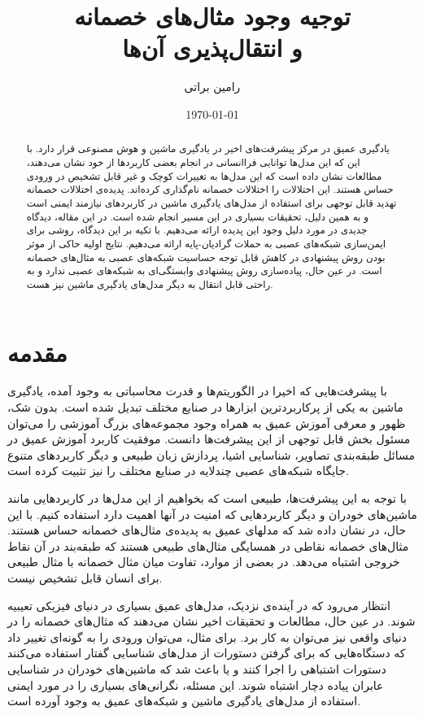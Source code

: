 \documentclass[12pt,onecolumn,a4paper]{article}
\begin{document}
\title{توجیه وجود مثال‌های خصمانه \\ و انتقال‌پذیری آن‌ها} 
\author{رامین براتی}
\date{\today}
\maketitle

\begin{abstract}
یادگیری عمیق در مرکز پیشرفت‌های اخیر در یادگیری ماشین و هوش مصنوعی قرار دارد. با این که این مدل‌ها توانایی فراانسانی در انجام بعضی کاربردها از خود نشان می‌دهند، مطالعات نشان داده است که این مدل‌ها به تغییرات کوچک و غیر قابل تشخیص در ورودی حساس هستند. این اختلالات را اختلالات خصمانه نام‌گذاری کرده‌اند. پدیده‌ی اختلالات خصمانه تهدید قابل توجهی برای استفاده از مدل‌های یادگیری ماشین در کاربردهای نیازمند ایمنی است و به همین دلیل، تحقیقات بسیاری در این مسیر انجام شده است. در این مقاله، دیدگاه جدیدی در مورد دلیل وجود این پدیده ارائه می‌دهیم. با تکیه بر این دیدگاه، روشی برای ایمن‌سازی شبکه‌های عصبی به حملات گرادیان-پایه ارائه می‌دهیم. نتایج اولیه حاکی از موثر بودن روش پیشنهادی در کاهش قابل توجه حساسیت شبکه‌های عصبی به مثال‌های خصمانه است. در عین حال، پیاده‌سازی روش پیشنهادی وابستگی‌ای به شبکه‌های عصبی ندارد و به راحتی قابل انتقال به دیگر مدل‌های یادگیری ماشین نیز هست.
\end{abstract}

\section{مقدمه} 
با پیشرفت‌هایی که اخیرا در الگوریتم‌ها و قدرت محاسباتی به وجود آمده، یادگیری ماشین به یکی از پرکاربردترین ابزارها در صنایع مختلف تبدیل شده است. بدون شک، ظهور و معرفی آموزش عمیق به همراه وجود مجموعه‌های بزرگ آموزشی را می‌توان مسئول بخش قابل توجهی از این پیشرفت‌ها دانست. موفقیت‌ کاربرد آموزش عمیق در مسائل طبقه‌بندی تصاویر، شناسایی اشیا، پردازش زبان طبیعی و دیگر کاربردهای متنوع جایگاه شبکه‌های عصبی چندلایه در صنایع مختلف را نیز تثبیت کرده است.

با توجه به این پیشرفت‌ها، طبیعی است که بخواهیم از این مدل‌ها در کاربردهایی مانند ماشین‌های خودران و دیگر کاربردهایی که امنیت در آنها اهمیت دارد استفاده کنیم. با این حال، در
\cite{szegedy2013intriguing} 
نشان داده شد که مدلهای عمیق به پدیده‌ی مثال‌های خصمانه حساس هستند. مثال‌های خصمانه نقاطی در همسایگی مثال‌های طبیعی هستند که طبقه‌بند در آن نقاط خروجی اشتباه می‌دهد. در بعضی از موارد، تفاوت میان مثال خصمانه با مثال طبیعی برای انسان قابل تشخیص نیست.

انتظار می‌رود که در آینده‌ی نزدیک، مدل‌های عمیق بسیاری در دنیای فیزیکی تعیبیه شوند. در عین حال، مطالعات و تحقیقات اخیر نشان می‌دهند که مثال‌های خصمانه را در دنیای واقعی نیز می‌توان به کار برد. برای مثال، می‌توان ورودی را به گونه‌ای تغییر داد که دستگاه‌هایی که برای گرفتن دستورات از مدل‌های شناسایی گفتار استفاده می‌کنند دستورات اشتباهی را اجرا کنند و یا باعث شد که ماشین‌های خودران در شناسایی عابران پیاده دچار اشتباه شوند. این مسئله، نگرانی‌های بسیاری را در مورد ایمنی استفاده از مدل‌های یادگیری ماشین و شبکه‌های عمیق به وجود آورده است.
\end{document}

